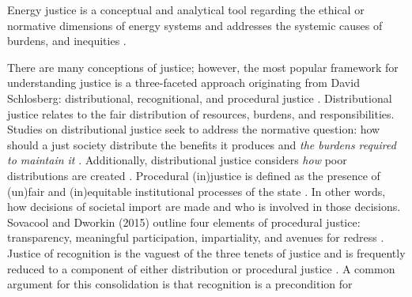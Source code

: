 


Energy justice is a conceptual and analytical tool regarding the ethical or
normative dimensions of energy systems and addresses the systemic causes of
burdens, and inequities \cite{sovacool_energy_2015}.

    
    There are many conceptions of justice; however, the most popular framework
    for understanding justice is a three-faceted approach originating from David
    Schlosberg: distributional, recognitional, and procedural justice
    \cite{schlosberg_2_2007}.
    Distributional justice relates to the fair distribution of resources,
    burdens, and responsibilities. Studies on distributional justice seek to
    address the normative question: how should a just society distribute the
    benefits it produces and \textit{the burdens required to maintain it}
    \cite{brighouse_justice_2004}. Additionally, distributional justice
    considers \textit{how} poor distributions are created
    \cite{schlosberg_2_2007}.
    Procedural (in)justice is defined as the presence of (un)fair and
    (in)equitable institutional processes of the state \cite{schlosberg_2_2007}.
    In other words, how decisions of societal import are made and who is
    involved in those decisions. Sovacool and Dworkin (2015) outline four
    elements of procedural justice: transparency, meaningful participation,
    impartiality, and avenues for redress \cite{sovacool_energy_2015}.    
Justice of recognition is the vaguest of the three tenets of justice and is
    frequently reduced to a component of either distribution or procedural
    justice \cite{schlosberg_2_2007, van_uffelen_revisiting_2022}. A common
    argument for this consolidation is that recognition is a precondition for
